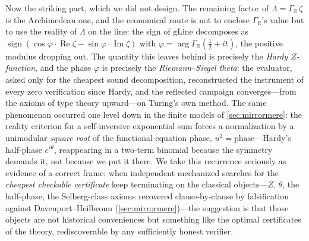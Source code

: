 Now the striking part, which we did not design. The remaining factor of
$\Lambda = \Gamma_{\mathbb{R}}\,\zeta$ is the Archimedean one, and the
economical route is not to enclose $\Gamma_{\mathbb{R}}$'s value but to use
the reality of $\Lambda$ on the line: the sign of $\mathrm{gLine}$
decomposes as
$\operatorname{sign}(\cos\varphi\cdot\operatorname{Re}\zeta -
\sin\varphi\cdot\operatorname{Im}\zeta)$ with
$\varphi = \arg\Gamma_{\mathbb{R}}(\tfrac12+it)$, the positive modulus
dropping out. The quantity this leaves behind is precisely the
\emph{Hardy $Z$-function}, and the phase $\varphi$ is precisely the
\emph{Riemann--Siegel theta}: the evaluator, asked only for the cheapest
sound decomposition, reconstructed the instrument of every zero verification
since Hardy, and the reflected campaign converges---from the axioms of type
theory upward---on Turing's own method. The same phenomenon occurred one
level down in the finite models of \cref{sec:mirrormere}: the reality
criterion for a self-inversive exponential sum forces a normalization by a
unimodular \emph{square root} of the functional-equation phase, $u^2 =
\mathrm{phase}$---Hardy's half-phase $e^{i\theta}$, reappearing in a
two-term binomial because the symmetry demands it, not because we put it
there. We take this recurrence seriously as evidence of a correct frame:
when independent mechanized searches for the \emph{cheapest checkable
certificate} keep terminating on the classical objects---$Z$, $\theta$, the
half-phase, the Selberg-class axioms recovered clause-by-clause by
falsification against Davenport--Heilbronn (\cref{sec:mirrormere})---the
suggestion is that those objects are not historical conveniences but
something like the optimal certificates of the theory, rediscoverable by
any sufficiently honest verifier.

